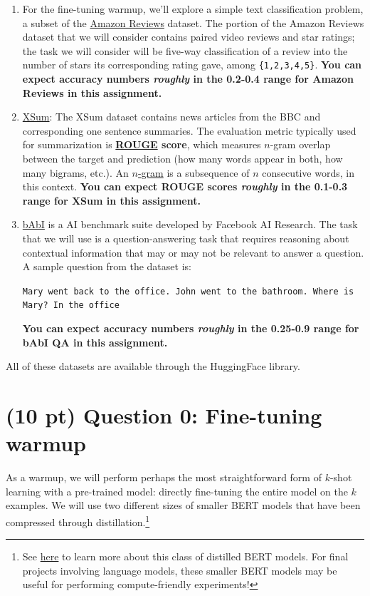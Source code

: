 \documentclass[12pt]{article}
\begin{document}
\begin{enumerate}
    \item For the fine-tuning warmup, we'll explore a simple text classification problem, a subset of the \href{https://huggingface.co/datasets/amazon\_us\_reviews}{Amazon Reviews} dataset. The portion of the Amazon Reviews dataset that we will consider contains paired video reviews and star ratings; the task we will consider will be five-way classification of a review into the number of stars its corresponding rating gave, among \texttt{\{1,2,3,4,5\}}. \textbf{You can expect accuracy numbers \textit{roughly} in the 0.2-0.4 range for Amazon Reviews in this assignment.}
    \item \href{https://huggingface.co/datasets/xsum}{XSum}: The XSum dataset contains news articles from the BBC and corresponding one sentence summaries. The evaluation metric typically used for summarization is \textbf{\href{https://en.wikipedia.org/wiki/ROUGE_(metric)}{ROUGE} score}, which measures $n$-gram overlap between the target and prediction (how many words appear in both, how many bigrams, etc.). An \href{https://en.wikipedia.org/wiki/N-gram#Examples}{$n$-gram} is a subsequence of $n$ consecutive words, in this context.  \textbf{You can expect ROUGE scores \textit{roughly} in the 0.1-0.3 range for XSum in this assignment.}
    \item \href{https://research.facebook.com/downloads/babi/}{bAbI} is a AI benchmark suite developed by Facebook AI Research. The task that we will use is a question-answering task that requires reasoning about contextual information that may or may not be relevant to answer a question. A sample question from the dataset is:
    
    \texttt{Mary went back to the office. John went to the bathroom. Where is Mary? In the office}
    
    \textbf{You can expect accuracy numbers \textit{roughly} in the 0.25-0.9 range for bAbI QA in this assignment.}
\end{enumerate}

All of these datasets are available through the HuggingFace library.

\section*{(10 pt) Question 0: Fine-tuning warmup}
As a warmup, we will perform perhaps the most straightforward form of $k$-shot learning with a pre-trained model: directly fine-tuning the entire model on the $k$ examples. We will use two different sizes of smaller BERT models that have been compressed through distillation.\footnote{See \href{https://arxiv.org/pdf/1908.08962.pdf}{here} to learn more about this class of distilled BERT models. For final projects involving language models, these smaller BERT models may be useful for performing compute-friendly experiments!}
\end{document}
